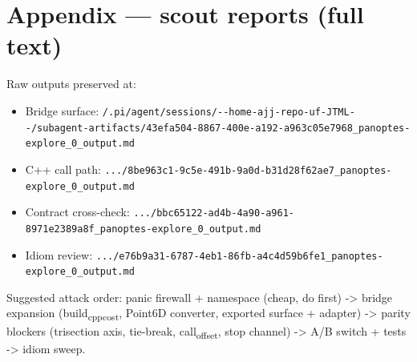 \documentclass[11pt]{article}
\begin{document}
\section{Appendix — scout reports (full text)}
\label{sec:orgb011b3e}

Raw outputs preserved at:
\begin{itemize}
\item Bridge surface: \texttt{/.pi/agent/sessions/-{}-{}home-ajj-repo-uf-JTML-{}-{}/subagent-artifacts/43efa504-8867-400e-a192-a963c05e7968\_panoptes-explore\_0\_output.md}
\item C++ call path: \texttt{.../8be963c1-9c5e-491b-9a0d-b31d28f62ae7\_panoptes-explore\_0\_output.md}
\item Contract cross-check: \texttt{.../bbc65122-ad4b-4a90-a961-8971e2389a8f\_panoptes-explore\_0\_output.md}
\item Idiom review: \texttt{.../e76b9a31-6787-4eb1-86fb-a4c4d59b6fe1\_panoptes-explore\_0\_output.md}
\end{itemize}

Suggested attack order: panic firewall + namespace (cheap, do first) ->
bridge expansion (build\textsubscript{cpp}\textsubscript{cost}, Point6D converter, exported surface +
adapter) -> parity blockers (trisection axis, tie-break, call\textsubscript{offset},
stop channel) -> A/B switch + tests -> idiom sweep.
\end{document}
